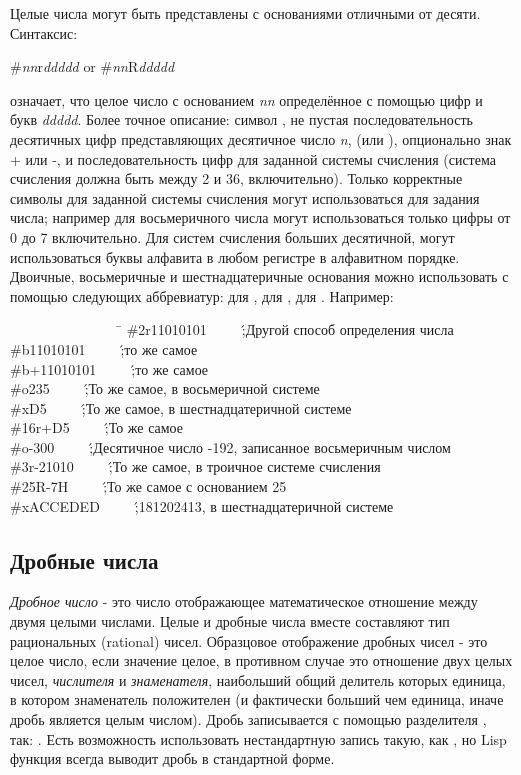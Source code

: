 Целые числа могут быть представлены с основаниями отличными от
десяти. Синтаксис: 
\begin{lisp}
\#\emph{nn}r\emph{ddddd}     \textrm{or}     \#\emph{nn}R\emph{ddddd}
\end{lisp}
означает, что целое число с основанием \emph{nn} определённое с
помощью цифр и букв \emph{ddddd}. Более точное описание:
символ \cd{\#}, не пустая последовательность десятичных цифр
представляющих десятичное число \emph{n},  (или ), опционально знак + или -, и последовательность цифр для заданной системы счисления (система счисления должна быть между 2 и 36, включительно). Только корректные символы для заданной системы счисления могут использоваться для задания числа; например для восьмеричного числа могут использоваться только цифры от 0 до 7 включительно. Для систем счисления больших десятичной, могут использоваться буквы алфавита в любом регистре в алфавитном порядке. Двоичные, восьмеричные и шестнадцатеричные основания можно использовать с помощью следующих аббревиатур:  для ,  для ,  для . Например:

\begin{lisp}
~~~~~~~~~~~~~~~~\=\kill
\>\#2r11010101~~~~~\';\textrm{Другой способ определения
числа } \\
\>\#b11010101~~~~~\';\textrm{то же самое} \\
\>\#b+11010101~~~~~\';\textrm{то же самое} \\
\>\#o235~~~~~\';\textrm{То же самое, в восьмеричной системе} \\
\>\#xD5~~~~~\';\textrm{То же самое, в шестнадцатеричной системе} \\
\>\#16r+D5~~~~~\';\textrm{То же самое} \\
\>\#o-300~~~~~\';\textrm{Десятичное число -192, записанное восьмеричным числом} \\
\>\#3r-21010~~~~~\';\textrm{То же самое, в троичное системе счисления} \\
\>\#25R-7H~~~~~\';\textrm{То же самое с основанием 25} \\
\>\#xACCEDED~~~~~\';\textrm{181202413, в шестнадцатеричной системе}
\end{lisp}

\subsection{Дробные числа}

\emph{Дробное число} - это число отображающее математическое отношение
между двумя целыми числами. Целые и дробные числа вместе
составляют тип рациональных (rational) чисел. Образцовое
отображение дробных чисел - это целое число, если значение целое,
в противном случае это отношение двух целых чисел, \emph{числителя} и
\emph{знаменателя}, наибольший общий делитель которых единица, в котором
знаменатель положителен (и фактически больший чем единица, иначе
дробь является целым числом). Дробь записывается с помощью
разделителя \cdf{/}, так: . Есть возможность
использовать нестандартную запись такую, как , но Lisp
функция  всегда выводит дробь в стандартной форме. 

